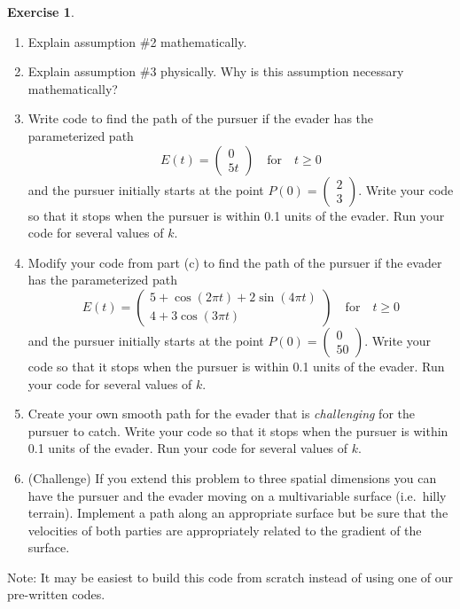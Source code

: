 \documentclass[
]{book}
\theoremstyle{definition}
\theoremstyle{definition}
\theoremstyle{definition}
\newtheorem{exercise}{Exercise}[chapter]
\theoremstyle{remark}
\begin{document}
\begin{exercise}
\begin{enumerate}
\def\labelenumi{\alph{enumi}.}
\item
  Explain assumption \#2 mathematically.
\item
  Explain assumption \#3 physically. Why is this assumption necessary
  mathematically?
\item
  Write code to find the path of the pursuer if the evader has the
  parameterized path
  \[E(t) = \begin{pmatrix} 0 \\ 5t \end{pmatrix} \quad \text{for} \quad t \ge 0\]
  and the pursuer initially starts at the point
  \(P(0) = \begin{pmatrix}  2\\3\end{pmatrix}\). Write your code so that it stops
  when the pursuer is within 0.1 units of the evader. Run your code
  for several values of \(k\).
\item
  Modify your code from part (c) to find the path of the pursuer if
  the evader has the parameterized path
  \[E(t) = \begin{pmatrix} 5 + \cos(2\pi t) + 2\sin(4\pi t) \\ 4 + 3\cos(3 \pi
                  t) \end{pmatrix}  \quad \text{for} \quad t \ge 0\]
  and the pursuer initially starts at the point
  \(P(0) = \begin{pmatrix} 0 \\ 50  \end{pmatrix}\). Write your code so that it stops when
  the pursuer is within 0.1 units of the evader. Run your code for
  several values of \(k\).
\item
  Create your own smooth path for the evader that is \emph{challenging} for
  the pursuer to catch. Write your code so that it stops when the
  pursuer is within 0.1 units of the evader. Run your code for several
  values of \(k\).
\item
  (Challenge) If you extend this problem to three spatial dimensions
  you can have the pursuer and the evader moving on a multivariable
  surface (i.e.~hilly terrain). Implement a path along an appropriate
  surface but be sure that the velocities of both parties are
  appropriately related to the gradient of the surface.
\end{enumerate}

Note: It may be easiest to build this code from scratch instead of using
one of our pre-written codes.
\end{exercise}
\end{document}
